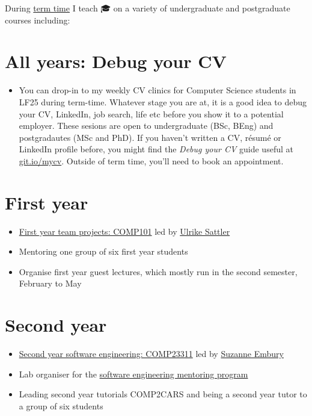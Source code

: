 \documentclass[12pt,]{book}
\providecommand{\tightlist}{%
  \setlength{\itemsep}{0pt}\setlength{\parskip}{0pt}}
\begin{document}
During \href{https://www.manchester.ac.uk/discover/key-dates/}{term time} I teach 🎓 on a variety of undergraduate and postgraduate courses including:

\hypertarget{all-years-debug-your-cv}{%
\section{All years: Debug your CV}\label{all-years-debug-your-cv}}

\begin{itemize}
\tightlist
\item
  You can drop-in to my weekly CV clinics for Computer Science students in LF25 during term-time. Whatever stage you are at, it is a good idea to debug your CV, LinkedIn, job search, life etc before you show it to a potential employer. These sesions are open to undergraduate (BSc, BEng) and postgradautes (MSc and PhD). If you haven't written a CV, résumé or LinkedIn profile before, you might find the \emph{Debug your CV} guide useful at \href{http://git.io/mycv}{git.io/mycv}. Outside of term time, you'll need to book an appointment.
\end{itemize}

\hypertarget{first-year}{%
\section{First year}\label{first-year}}

\begin{itemize}
\tightlist
\item
  \href{https://studentnet.cs.manchester.ac.uk/ugt/COMP10120/syllabus/}{First year team projects: COMP101} led by \href{http://www.cs.man.ac.uk/~sattler/}{Ulrike Sattler}
\item
  Mentoring one group of six first year students
\item
  Organise first year guest lectures, which mostly run in the second semester, February to May
\end{itemize}

\hypertarget{second-year}{%
\section{Second year}\label{second-year}}

\begin{itemize}
\tightlist
\item
  \href{https://studentnet.cs.manchester.ac.uk/ugt/COMP23311/syllabus/}{Second year software engineering: COMP23311} led by \href{http://www.cs.man.ac.uk/~embury/}{Suzanne Embury}
\item
  Lab organiser for the \href{https://www.cs.manchester.ac.uk/connect/business-engagement/industrial-mentoring/}{software engineering mentoring program}
\item
  Leading second year tutorials COMP2CARS and being a second year tutor to a group of six students
\end{itemize}
\end{document}
